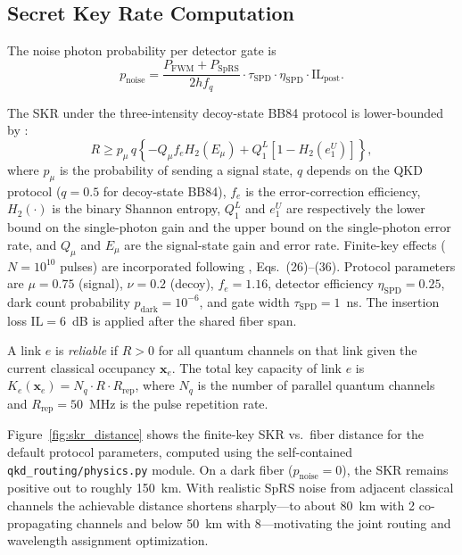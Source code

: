 \documentclass[conference]{IEEEtran}
\begin{document}
\subsection{Secret Key Rate Computation}

The noise photon probability per detector gate is
\begin{equation}
p_{\text{noise}} = \frac{P_{\text{FWM}} + P_{\text{SpRS}}}{2 h f_q} \cdot \tau_{\text{SPD}} \cdot \eta_{\text{SPD}} \cdot \text{IL}_{\text{post}}.
\label{eq:p_noise}
\end{equation}

The SKR under the three-intensity decoy-state BB84 protocol \cite{b1} is lower-bounded by \cite{b10}:
\begin{equation}
R \ge p_\mu\, q \left\{ -Q_\mu f_e H_2(E_\mu) + Q_1^L \left[ 1 - H_2(e_1^U) \right] \right\},
\label{eq:skr}
\end{equation}
where $p_\mu$ is the probability of sending a signal state, $q$ depends on the QKD protocol ($q = 0.5$ for decoy-state BB84), $f_e$ is the error-correction efficiency, $H_2(\cdot)$ is the binary Shannon entropy, $Q_1^L$ and $e_1^U$ are respectively the lower bound on the single-photon gain and the upper bound on the single-photon error rate, and $Q_\mu$ and $E_\mu$ are the signal-state gain and error rate. Finite-key effects ($N = 10^{10}$ pulses) are incorporated following \cite{bGao}, Eqs.~(26)--(36). Protocol parameters are $\mu = 0.75$ (signal), $\nu = 0.2$ (decoy), $f_e = 1.16$, detector efficiency $\eta_{\text{SPD}} = 0.25$, dark count probability $p_{\text{dark}} = 10^{-6}$, and gate width $\tau_{\text{SPD}} = 1$~ns. The insertion loss $\text{IL} = 6$~dB is applied after the shared fiber span.

A link $e$ is \emph{reliable} if $R > 0$ for all quantum channels on that link given the current classical occupancy $\mathbf{x}_e$. The total key capacity of link $e$ is $K_e(\mathbf{x}_e) = N_q \cdot R \cdot R_{\text{rep}}$, where $N_q$ is the number of parallel quantum channels and $R_{\text{rep}} = 50$~MHz is the pulse repetition rate.

Figure~\ref{fig:skr_distance} shows the finite-key SKR vs.\ fiber distance for the default protocol parameters, computed using the self-contained \texttt{qkd\_routing/physics.py} module. On a dark fiber ($p_{\text{noise}} = 0$), the SKR remains positive out to roughly 150~km. With realistic SpRS noise from adjacent classical channels the achievable distance shortens sharply---to about 80~km with 2 co-propagating channels and below 50~km with 8---motivating the joint routing and wavelength assignment optimization.
\end{document}
